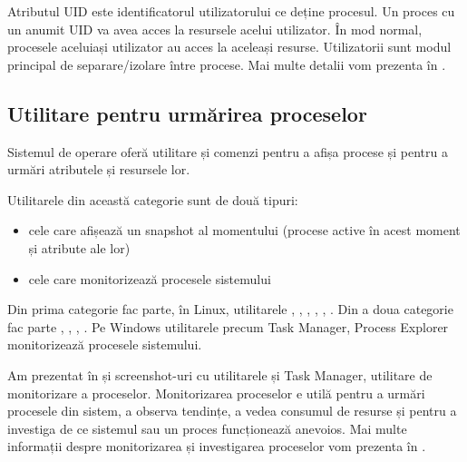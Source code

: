 
Atributul UID  este identificatorul utilizatorului ce deține procesul.
Un proces cu un anumit UID va avea acces la resursele acelui utilizator.
În mod normal, procesele aceluiași utilizator au acces la aceleași resurse.
Utilizatorii sunt modul principal de separare/izolare între procese.
Mai multe detalii vom prezenta în .

\subsection{Utilitare pentru urmărirea proceselor}
\label{sec:process:monitoring}

Sistemul de operare oferă utilitare și comenzi pentru a afișa procese și pentru a urmări atributele și resursele lor.

Utilitarele din această categorie sunt de două tipuri:

\begin{itemize}
  \item cele care afișează un snapshot al momentului (procese active în acest moment și atribute ale lor)
  \item cele care monitorizează procesele sistemului
\end{itemize}

Din prima categorie fac parte, în Linux, utilitarele , , , , , .
Din a doua categorie fac parte , , , .
Pe Windows utilitarele precum Task Manager, Process Explorer monitorizează procesele sistemului.

Am prezentat în  și  screenshot-uri cu utilitarele  și Task Manager, utilitare de monitorizare a proceselor.
Monitorizarea proceselor e utilă pentru a urmări procesele din sistem, a observa tendințe, a vedea consumul de resurse și pentru a investiga de ce sistemul sau un proces funcționează anevoios.
Mai multe informații despre monitorizarea și investigarea proceselor vom prezenta în .

